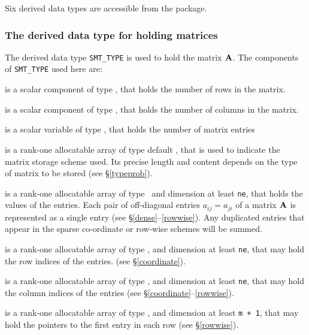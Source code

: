 \documentclass{galahad}
\begin{document}
\galtypes
Six derived data types are accessible from the package.


\subsubsection{The derived data type for holding matrices}\label{typesmt}
The derived data type {\tt SMT\_TYPE} is used to hold the matrix ${\mathbf{A}}$.
The components of {\tt SMT\_TYPE} used here are:

\begin{description}

 is a scalar component of type \integer, 
that holds the number of rows in the matrix. 
 
 is a scalar component of type \integer, 
that holds the number of columns in the matrix. 
 
 is a scalar variable of type \integer, that
holds the number of matrix entries

 is a rank-one allocatable array of type default \character, that
is used to indicate the matrix storage scheme used. Its precise length and
content depends on the type of matrix to be stored (see \S\ref{typeprob}).

 is a rank-one allocatable array of type \realdp\, 
and dimension at least {\tt ne}, that holds the values of the entries. 
Each pair of off-diagonal entries $a_{ij} = a_{ji}$ of a matrix ${\mathbf{A}}$ 
is represented as a single entry 
(see \S\ref{dense}--\ref{rowwise}).
Any duplicated entries that appear in the sparse 
co-ordinate or row-wise schemes will be summed. 

 is a rank-one allocatable array of type \integer, 
and dimension at least {\tt ne}, that may hold the row indices of the entries. 
(see \S\ref{coordinate}).

 is a rank-one allocatable array of type \integer, 
and dimension at least {\tt ne}, that may hold the column indices of the entries
(see \S\ref{coordinate}--\ref{rowwise}).

 is a rank-one allocatable array of type \integer, 
and dimension at least {\tt m + 1}, that may hold the pointers to
the first entry in each row (see \S\ref{rowwise}).

\end{description}

\end{document}

